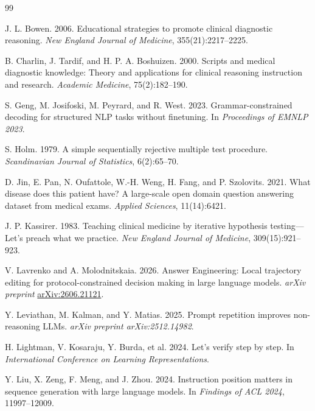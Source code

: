 \documentclass[10pt]{article}
\begin{document}
\begin{thebibliography}{99}\footnotesize
\setlength{\bibsep}{0pt}

J. L. Bowen. 2006. Educational strategies to promote clinical diagnostic reasoning. \emph{New England Journal of Medicine}, 355(21):2217--2225.

B. Charlin, J. Tardif, and H. P. A. Boshuizen. 2000. Scripts and medical diagnostic knowledge: Theory and applications for clinical reasoning instruction and research. \emph{Academic Medicine}, 75(2):182--190.

S. Geng, M. Josifoski, M. Peyrard, and R. West. 2023. Grammar-constrained decoding for structured NLP tasks without finetuning. In \emph{Proceedings of EMNLP 2023}.

S. Holm. 1979. A simple sequentially rejective multiple test procedure. \emph{Scandinavian Journal of Statistics}, 6(2):65--70.

D. Jin, E. Pan, N. Oufattole, W.-H. Weng, H. Fang, and P. Szolovits. 2021. What disease does this patient have? A large-scale open domain question answering dataset from medical exams. \emph{Applied Sciences}, 11(14):6421.

J. P. Kassirer. 1983. Teaching clinical medicine by iterative hypothesis testing---Let's preach what we practice. \emph{New England Journal of Medicine}, 309(15):921--923.

V. Lavrenko and A. Molodnitskaia. 2026. Answer Engineering: Local trajectory editing for protocol-constrained decision making in large language models. \emph{arXiv preprint} \href{https://arxiv.org/abs/2606.21121}{arXiv:2606.21121}.

Y. Leviathan, M. Kalman, and Y. Matias. 2025. Prompt repetition improves non-reasoning LLMs. \emph{arXiv preprint arXiv:2512.14982}.

H. Lightman, V. Kosaraju, Y. Burda, et al. 2024. Let's verify step by step. In \emph{International Conference on Learning Representations}.

Y. Liu, X. Zeng, F. Meng, and J. Zhou. 2024. Instruction position matters in sequence generation with large language models. In \emph{Findings of ACL 2024}, 11997--12009.


\end{thebibliography}
\end{document}
